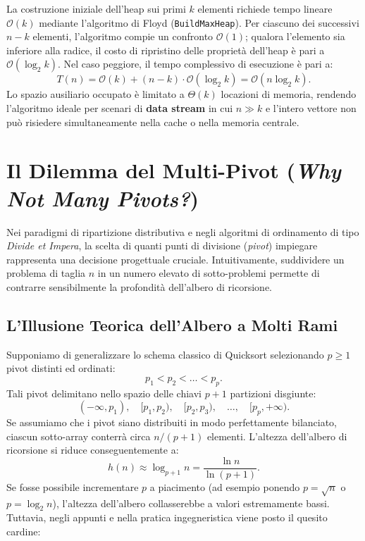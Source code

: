 \begin{property}
La costruzione iniziale dell'heap sui primi $k$ elementi richiede tempo lineare $\mathcal{O}(k)$ mediante l'algoritmo di Floyd (\texttt{BuildMaxHeap}). Per ciascuno dei successivi $n - k$ elementi, l'algoritmo compie un confronto $\mathcal{O}(1)$; qualora l'elemento sia inferiore alla radice, il costo di ripristino delle proprietà dell'heap è pari a $\mathcal{O}(\log_2 k)$. Nel caso peggiore, il tempo complessivo di esecuzione è pari a:
\begin{equation}
  T(n) = \mathcal{O}(k) + (n - k) \cdot \mathcal{O}(\log_2 k) = \mathcal{O}(n \log_2 k).
\end{equation}
Lo spazio ausiliario occupato è limitato a $\Theta(k)$ locazioni di memoria, rendendo l'algoritmo ideale per scenari di \textbf{data stream} in cui $n \gg k$ e l'intero vettore non può risiedere simultaneamente nella cache o nella memoria centrale.
\end{property}

\FloatBarrier
\section{Il Dilemma del Multi-Pivot (\textit{Why Not Many Pivots?})}
\label{sec:multi-pivot-dilemma}

Nei paradigmi di ripartizione distributiva e negli algoritmi di ordinamento di tipo \textit{Divide et Impera}, la scelta di quanti punti di divisione (\textit{pivot}) impiegare rappresenta una decisione progettuale cruciale. Intuitivamente, suddividere un problema di taglia $n$ in un numero elevato di sotto-problemi permette di contrarre sensibilmente la profondità dell'albero di ricorsione.
\FloatBarrier

\subsection{L'Illusione Teorica dell'Albero a Molti Rami}
\label{subsec:tree-depth-illusion}

Supponiamo di generalizzare lo schema classico di Quicksort selezionando $p \ge 1$ pivot distinti ed ordinati:
\begin{equation}
  p_1 < p_2 < \dots < p_p.
\end{equation}
Tali pivot delimitano nello spazio delle chiavi $p + 1$ partizioni disgiunte:
\begin{equation}
  (-\infty, p_1), \quad [p_1, p_2), \quad [p_2, p_3), \quad \dots, \quad [p_p, +\infty).
\end{equation}
Se assumiamo che i pivot siano distribuiti in modo perfettamente bilanciato, ciascun sotto-array conterrà circa $n / (p + 1)$ elementi. L'altezza dell'albero di ricorsione si riduce conseguentemente a:
\begin{equation}
  h(n) \approx \log_{p+1} n = \frac{\ln n}{\ln(p + 1)}.
\end{equation}
Se fosse possibile incrementare $p$ a piacimento (ad esempio ponendo $p = \sqrt{n}$ o $p = \log_2 n$), l'altezza dell'albero collasserebbe a valori estremamente bassi. Tuttavia, negli appunti e nella pratica ingegneristica viene posto il quesito cardine:

